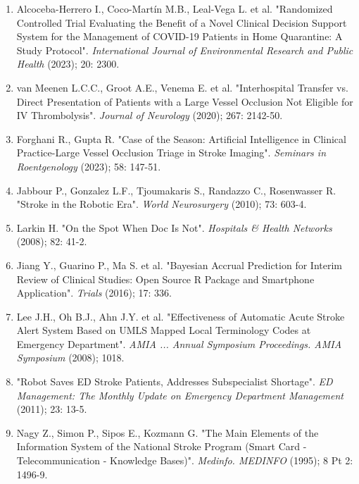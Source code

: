 {{\begin{enumerate}
    \item Alcoceba-Herrero I., Coco-Martín M.B., Leal-Vega L. et al. "Randomized Controlled Trial Evaluating the Benefit of a Novel Clinical Decision Support System for the Management of COVID-19 Patients in Home Quarantine: A Study Protocol". \textit{International Journal of Environmental Research and Public Health} (2023); 20: 2300.
    \item van Meenen L.C.C., Groot A.E., Venema E. et al. "Interhospital Transfer vs. Direct Presentation of Patients with a Large Vessel Occlusion Not Eligible for IV Thrombolysis". \textit{Journal of Neurology} (2020); 267: 2142-50.
    \item Forghani R., Gupta R. "Case of the Season: Artificial Intelligence in Clinical Practice-Large Vessel Occlusion Triage in Stroke Imaging". \textit{Seminars in Roentgenology} (2023); 58: 147-51.
    \item Jabbour P., Gonzalez L.F., Tjoumakaris S., Randazzo C., Rosenwasser R. "Stroke in the Robotic Era". \textit{World Neurosurgery} (2010); 73: 603-4.
    \item Larkin H. "On the Spot When Doc Is Not". \textit{Hospitals \& Health Networks} (2008); 82: 41-2.
    \item Jiang Y., Guarino P., Ma S. et al. "Bayesian Accrual Prediction for Interim Review of Clinical Studies: Open Source R Package and Smartphone Application". \textit{Trials} (2016); 17: 336.
    \item Lee J.H., Oh B.J., Ahn J.Y. et al. "Effectiveness of Automatic Acute Stroke Alert System Based on UMLS Mapped Local Terminology Codes at Emergency Department". \textit{AMIA ... Annual Symposium Proceedings. AMIA Symposium} (2008); 1018.
    \item "Robot Saves ED Stroke Patients, Addresses Subspecialist Shortage". \textit{ED Management: The Monthly Update on Emergency Department Management} (2011); 23: 13-5.
    \item Nagy Z., Simon P., Sipos E., Kozmann G. "The Main Elements of the Information System of the National Stroke Program (Smart Card - Telecommunication - Knowledge Bases)". \textit{Medinfo. MEDINFO} (1995); 8 Pt 2: 1496-9.
\end{enumerate}
}
}
